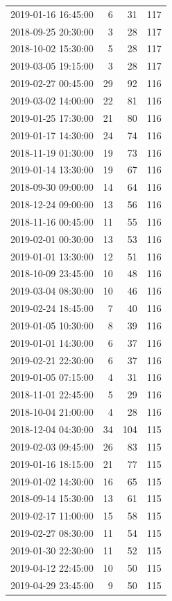 \begin{tabular}{lrrr}
2019-01-16 16:45:00 & 6 & 31 & 117 \\
2018-09-25 20:30:00 & 3 & 28 & 117 \\
2018-10-02 15:30:00 & 5 & 28 & 117 \\
2019-03-05 19:15:00 & 3 & 28 & 117 \\
2019-02-27 00:45:00 & 29 & 92 & 116 \\
2019-03-02 14:00:00 & 22 & 81 & 116 \\
2019-01-25 17:30:00 & 21 & 80 & 116 \\
2019-01-17 14:30:00 & 24 & 74 & 116 \\
2018-11-19 01:30:00 & 19 & 73 & 116 \\
2019-01-14 13:30:00 & 19 & 67 & 116 \\
2018-09-30 09:00:00 & 14 & 64 & 116 \\
2018-12-24 09:00:00 & 13 & 56 & 116 \\
2018-11-16 00:45:00 & 11 & 55 & 116 \\
2019-02-01 00:30:00 & 13 & 53 & 116 \\
2019-01-01 13:30:00 & 12 & 51 & 116 \\
2018-10-09 23:45:00 & 10 & 48 & 116 \\
2019-03-04 08:30:00 & 10 & 46 & 116 \\
2019-02-24 18:45:00 & 7 & 40 & 116 \\
2019-01-05 10:30:00 & 8 & 39 & 116 \\
2019-01-01 14:30:00 & 6 & 37 & 116 \\
2019-02-21 22:30:00 & 6 & 37 & 116 \\
2019-01-05 07:15:00 & 4 & 31 & 116 \\
2018-11-01 22:45:00 & 5 & 29 & 116 \\
2018-10-04 21:00:00 & 4 & 28 & 116 \\
2018-12-04 04:30:00 & 34 & 104 & 115 \\
2019-02-03 09:45:00 & 26 & 83 & 115 \\
2019-01-16 18:15:00 & 21 & 77 & 115 \\
2019-01-02 14:30:00 & 16 & 65 & 115 \\
2018-09-14 15:30:00 & 13 & 61 & 115 \\
2019-02-17 11:00:00 & 15 & 58 & 115 \\
2019-02-27 08:30:00 & 11 & 54 & 115 \\
2019-01-30 22:30:00 & 11 & 52 & 115 \\
2019-04-12 22:45:00 & 10 & 50 & 115 \\
2019-04-29 23:45:00 & 9 & 50 & 115 \\

\end{tabular}
